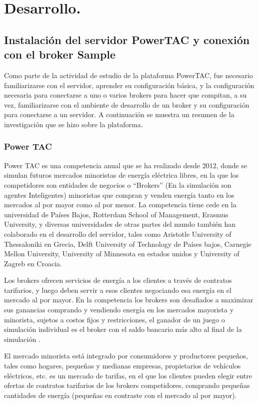 \chapter{Desarrollo.}
\section{Instalación del servidor PowerTAC y conexión con el broker Sample}

Como parte de la actividad de estudio de la plataforma PowerTAC, fue necesario familiarizarse con el servidor, aprender su configuración básica, y la configuración necesaria para conectarse a uno o varios brokers para hacer que compitan, a su vez, familiarizarse con el ambiente de desarrollo de un broker y su configuración para conectarse a un servidor. A continuación se muestra un resumen de la investigación que se hizo sobre la plataforma.
\subsection{Power TAC}

Power TAC es una competencia anual que se ha realizado desde 2012, donde se simulan futuros mercados minoristas de energía eléctrica libres, en la que los competidores son entidades de negocios o ``Brokers'' (En la simulación son agentes Inteligentes) minoristas que compran y venden energía tanto en los mercados al por mayor como al por menor. La competencia tiene cede en la universidad de Países Bajos, Rotterdam School of Management, Erasmus University, y diversas universidades de otras partes del mundo también han colaborado en el desarrollo del servidor, tales como Aristotle University of Thessaloniki en Grecia, Delft University of Technology de Países bajos, Carnegie Mellon University, University of Minnesota en estados unidos y University of Zagreb en Croacia.

Los brokers ofrecen servicios de energía a los clientes a través de contratos tarifarios, y luego deben servir a esos clientes negociando esa energía en el mercado al por mayor. En la competencia los brokers son desafiados a maximizar sus ganancias comprando y vendiendo energía en los mercados mayorista y minorista, sujetos a costos fijos y restricciones, el ganador de un juego o simulación individual es el broker con el saldo bancario más alto al final de la simulación \cite{WKetterJCollinsyMdWeerdtThe2017PowerTAC}.

El mercado minorista está integrado por consumidores y productores pequeños, tales como hogares, pequeñas y medianas empresas, propietarios de vehículos eléctricos, etc. es un mercado de tarifas, en el que los clientes pueden elegir entre ofertas de contratos tarifarios de los brokers competidores, comprando pequeñas cantidades de energía (pequeñas en contraste con el mercado al por mayor).

